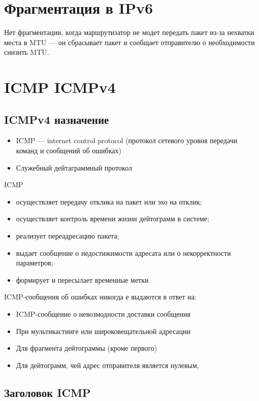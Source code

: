 \documentclass[10pt,a4paper,oneside,titlepage]{report}
\theoremstyle{defenition}
\begin{document}
\section{Фрагментация в IPv6}

Нет фрагментации, когда маршрутизатор не модет передать пакет из-за нехватки места в MTU --- он сбрасывает пакет и сообщает отправителю о необходимости снизить MTU.

\section{ICMP ICMPv4}

\subsection{ICMPv4 назначение}

\begin{itemize}
	\item ICMP --- internet control protocol (протокол сетевого уровня передачи команд и сообщений об ошибках)
	\item Служебный дейтаграммный протокол
\end{itemize}

ICMP
\begin{itemize}
	\item осуществляет передачу отклика на пакет или эхо на отклик;
	\item осуществляет контроль времени жизни дейтограмм в системе;
	\item реализует переадресацию пакета;
	\item выдает сообщение о недостижимости адресата или о некорректности параметров;
	\item формирует и пересылает временные метки
\end{itemize}

ICMP-сообщения об ошибках никогда е выдаются в ответ на:
\begin{itemize}
	\item ICMP-сообщение о невозмодности доставки сообщения
	\item При мультикастинге или широковещательной адресации
	\item Для фрагмента дейтограммы (кроме первого)
	\item Для дейтограмм, чей адрес отправителя является нулевым,
\end{itemize}

\subsection{Заголовок ICMP}
\end{document}
